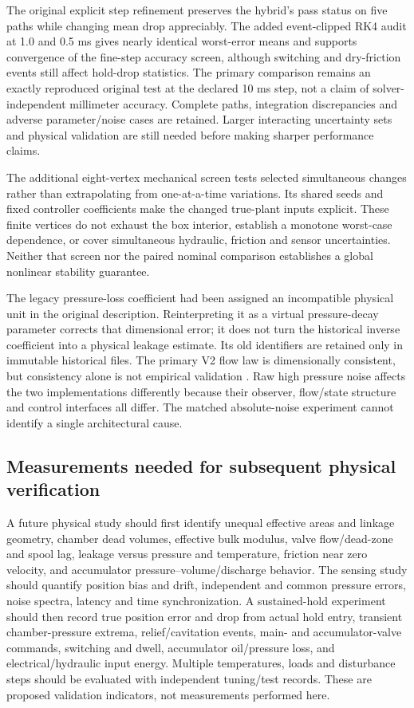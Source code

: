 \documentclass[machines,article,submit,pdftex,moreauthors]{Definitions/mdpi}
\begin{document}
The original explicit step refinement preserves the hybrid's pass status on five paths while changing mean drop appreciably. The added event-clipped RK4 audit at 1.0 and 0.5 ms gives nearly identical worst-error means and supports convergence of the fine-step accuracy screen, although switching and dry-friction events still affect hold-drop statistics. The primary comparison remains an exactly reproduced original test at the declared 10 ms step, not a claim of solver-independent millimeter accuracy. Complete paths, integration discrepancies and adverse parameter/noise cases are retained. Larger interacting uncertainty sets and physical validation are still needed before making sharper performance claims.

The additional eight-vertex mechanical screen tests selected simultaneous changes rather than extrapolating from one-at-a-time variations. Its shared seeds and fixed controller coefficients make the changed true-plant inputs explicit. These finite vertices do not exhaust the box interior, establish a monotone worst-case dependence, or cover simultaneous hydraulic, friction and sensor uncertainties. Neither that screen nor the paired nominal comparison establishes a global nonlinear stability guarantee.

The legacy pressure-loss coefficient had been assigned an incompatible physical unit in the original description. Reinterpreting it as a virtual pressure-decay parameter corrects that dimensional error; it does not turn the historical inverse coefficient into a physical leakage estimate. Its old identifiers are retained only in immutable historical files. The primary V2 flow law is dimensionally consistent, but consistency alone is not empirical validation \cite{sargent2013}. Raw high pressure noise affects the two implementations differently because their observer, flow/state structure and control interfaces all differ. The matched absolute-noise experiment cannot identify a single architectural cause.

\subsection{Measurements needed for subsequent physical verification}
A future physical study should first identify unequal effective areas and linkage geometry, chamber dead volumes, effective bulk modulus, valve flow/dead-zone and spool lag, leakage versus pressure and temperature, friction near zero velocity, and accumulator pressure--volume/discharge behavior. The sensing study should quantify position bias and drift, independent and common pressure errors, noise spectra, latency and time synchronization. A sustained-hold experiment should then record true position error and drop from actual hold entry, transient chamber-pressure extrema, relief/cavitation events, main- and accumulator-valve commands, switching and dwell, accumulator oil/pressure loss, and electrical/hydraulic input energy. Multiple temperatures, loads and disturbance steps should be evaluated with independent tuning/test records. These are proposed validation indicators, not measurements performed here.
\end{document}
